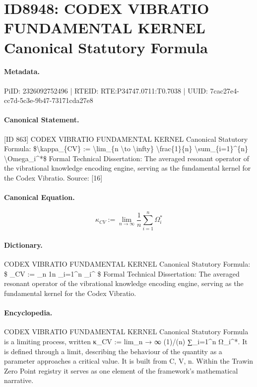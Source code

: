 \section*{ID8948: CODEX VIBRATIO FUNDAMENTAL KERNEL Canonical Statutory Formula}
\paragraph{Metadata.}
PiID: 2326092752496 | RTEID: RTE:P34747.0711:T0.7038 | UUID: 7cac27e4-cc7d-5c3e-9b47-73171cda27e8

\paragraph{Canonical Statement.}
[ID 863] CODEX VIBRATIO FUNDAMENTAL KERNEL Canonical Statutory Formula: \$\textbackslash{}kappa\_\{CV\} := \textbackslash{}lim\_\{n \textbackslash{}to \textbackslash{}infty\} \textbackslash{}frac\{1\}\{n\} \textbackslash{}sum\_\{i=1\}\textasciicircum{}\{n\} \textbackslash{}Omega\_i\textasciicircum{}*\$ Formal Technical Dissertation: The averaged resonant operator of the vibrational knowledge encoding engine, serving as the fundamental kernel for the Codex Vibratio. Source: [16]

\paragraph{Canonical Equation.}
\[
\kappa_{CV} := \lim_{n \to \infty} \frac{1}{n} \sum_{i=1}^{n} \Omega_i^*
\]

\paragraph{Dictionary.}
CODEX VIBRATIO FUNDAMENTAL KERNEL Canonical Statutory Formula: \$ \_CV := \_n 1n \_i=1\textasciicircum{}n \_i\textasciicircum{} \$ Formal Technical Dissertation: The averaged resonant operator of the vibrational knowledge encoding engine, serving as the fundamental kernel for the Codex Vibratio.

\paragraph{Encyclopedia.}
CODEX VIBRATIO FUNDAMENTAL KERNEL Canonical Statutory Formula is a limiting process, written κ\_CV := lim\_n → ∞ (1)/(n) ∑\_i=1\textasciicircum{}n Ω\_i\textasciicircum{}*. It is defined through a limit, describing the behaviour of the quantity as a parameter approaches a critical value. It is built from C, V, n. Within the Trawin Zero Point registry it serves as one element of the framework's mathematical narrative.
